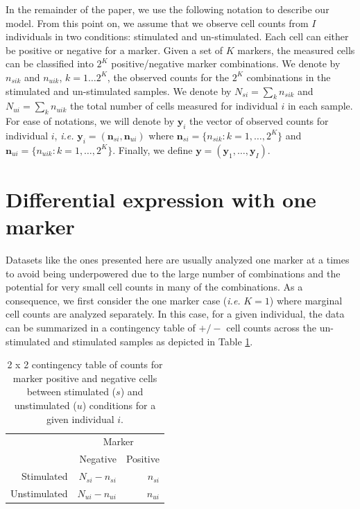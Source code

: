 \documentclass[useAMS,referee,usenatbib]{biom}
\begin{document}
In the remainder of the paper, we use the following notation to describe our model.  From this point on, we assume that we observe cell counts from $I$ individuals in two conditions: stimulated and un-stimulated. Each cell can either be positive or negative for a marker. Given a set of $K$ markers, the measured cells can be classified into $2^K$ positive/negative marker combinations. We denote by $n_{sik}$ and $n_{uik}$, $k=1\dots 2^K$, the observed counts for the $2^K$ combinations in the stimulated and un-stimulated samples. We denote by $N_{si}=\sum_k n_{sik}$ and $N_{ui}=\sum_k n_{uik}$ the total number of cells measured for individual $i$ in each sample. For ease of notations, we will denote by $\mathbf{y}_i$ the vector of observed counts for individual $i$, \textit{i.e.} $\mathbf{y}_{i}=(\mathbf{n}_{si}, \mathbf{n}_{ui})$ where $\mathbf{n}_{si}=\{n_{sik}: k=1,\dots,2^K\}$ and $\mathbf{n}_{ui}=\{n_{uik}: k=1,\dots,2^K\}$. Finally, we define $\mathbf{y}=(\mathbf{y}_1,\dots,\mathbf{y}_I)$.

\section{Differential expression with one marker}
\label{s:DEone}
Datasets like the ones presented here are usually analyzed one marker at a times to avoid being underpowered due to the large number of combinations and the potential for very small cell counts in many of the combinations. As a consequence, we first consider the one marker case (\textit{i.e.} $K=1$) where marginal cell counts are analyzed separately. In this case, for a given individual, the data can be summarized in a contingency table of $+/-$ cell counts across the un-stimulated and stimulated samples as depicted in Table \ref{tab:twobytwo}.

\begin{table}
\centering
\parbox{0.8\linewidth}{
\caption{2 x 2 contingency table of counts for marker positive and negative cells between stimulated ($s$) and unstimulated ($u$) conditions for a given individual $i$.}\label{tab:twobytwo}
\centering
\begin{tabular}{rrr}

  \hline
\multicolumn{1}{l}{}&
\multicolumn{2}{c}{Marker}\\
 & Negative & Positive \\ 
  \hline
Stimulated &   $N_{si} - n_{si}$ &   $n_{si}$ \\ 
Unstimulated &   $N_{ui}-n_{ui}$ &   $n_{ui}$ \\ 
   \hline
\end{tabular}
}
\end{table}
\end{document}
